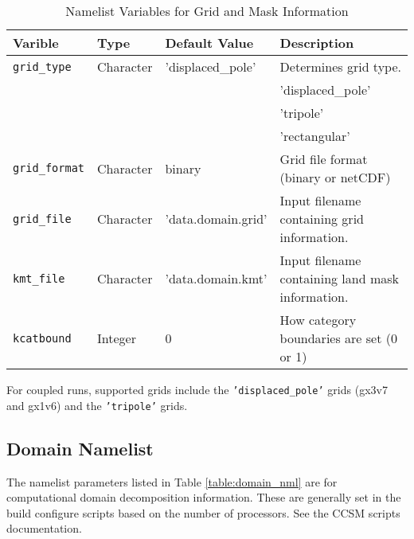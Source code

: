 \begin{table}
  \begin{center}
  \caption{Namelist Variables for Grid and Mask Information}
  \label{table:grid_nml}
  \begin{tabular}{p{2.5cm}p{2.5cm}p{3cm}p{6.0cm}} \hline
  Varible & Type & Default Value & Description               \\
\hline \hline

{\tt grid\_type} &  Character & 'displaced\_pole' &  Determines grid type. \\
          &            &   &  'displaced\_pole' \\
          &            &   &  'tripole' \\
          &            &   &  'rectangular' \\

{\tt grid\_format} & Character & binary & Grid file format (binary or netCDF) \\

{\tt grid\_file} &  Character & 'data.domain.grid' &  Input filename
                                           containing grid information. \\

{\tt kmt\_file} &  Character & 'data.domain.kmt' &  Input filename
                                       containing land mask information. \\

{\tt kcatbound} & Integer & 0 & How category boundaries are set (0 or 1) \\

  \hline
  \end{tabular}
  \end{center}
\end{table}

For coupled runs, supported grids include the {\tt 'displaced\_pole'} grids 
(gx3v7 and gx1v6) and the {\tt 'tripole'} grids.

\subsection{Domain Namelist}

The namelist parameters listed in Table \ref{table:domain_nml} are for
computational domain decomposition information. These are generally set in
the build configure scripts based on the number of processors. See the CCSM
scripts documentation.

